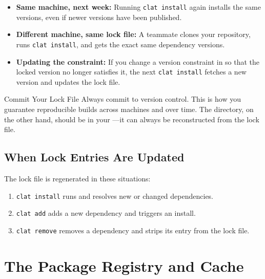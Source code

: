 \begin{itemize}
  \item \textbf{Same machine, next week:} Running \lstinline|clat install| again installs the same versions, even if newer versions have been published.

  \item \textbf{Different machine, same lock file:} A teammate clones your repository, runs \lstinline|clat install|, and gets the exact same dependency versions.

  \item \textbf{Updating the constraint:} If you change a version constraint in  so that the locked version no longer satisfies it, the next \lstinline|clat install| fetches a new version and updates the lock file.
\end{itemize}

\begin{warnbox}{Commit Your Lock File}
Always commit  to version control.
This is how you guarantee reproducible builds across machines and over time.
The  directory, on the other hand, should be in your ---it can always be reconstructed from the lock file.
\end{warnbox}

\subsection{When Lock Entries Are Updated}\label{subsec:lock-updates}

The lock file is regenerated in these situations:

\begin{enumerate}
  \item \texttt{clat install} runs and resolves new or changed dependencies.
  \item \texttt{clat add} adds a new dependency and triggers an install.
  \item \texttt{clat remove} removes a dependency and strips its entry from the lock file.
\end{enumerate}

\section{The Package Registry and Cache}\label{sec:registry-cache}

